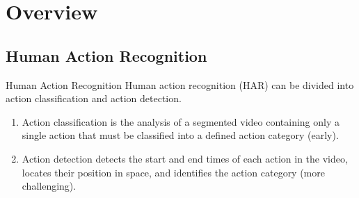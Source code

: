 \section{Overview}
\subsection{Human Action Recognition}
\begin{frame}{Human Action Recognition}
    Human action recognition (HAR) can be divided into action classification and action detection.

    \begin{enumerate}
        \item<1-> Action classification is the analysis of a segmented video containing only a single action that must be classified into a defined action category (early).
        \item<2-> Action detection detects the start and end times of each action in the video, locates their position in space, and identifies the action category (more challenging).
    \end{enumerate}


\end{frame}

